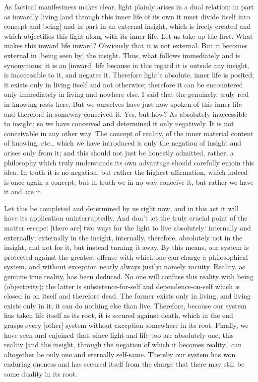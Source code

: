 As factical manifestness makes clear,
light plainly arises in a dual relation:
in part as inwardly living
[and through this inner life of its own it must
divide itself into concept and being]
and in part in an external insight,
which is freely created
and which objectifies this light
along with its inner life.
Let us take up the first.
What makes this inward life inward?
Obviously that it is not external.
But it becomes external in [being seen by] the insight.
Thus, what follows immediately and is synonymous:
it is an [inward] life because in this regard it is
outside any insight, is inaccessible to it, and negates it.
Therefore light's absolute, inner life is posited;
it exists only in living itself and not otherwise;
therefore it can be encountered only immediately
in living and nowhere else.
I said that the genuinely, truly real in knowing rests here.
But we ourselves have just now spoken of this inner life
and therefore in someway conceived it.
Yes, but how? As absolutely inaccessible to insight;
so we have conceived and determined it only negatively.
It is not conceivable in any other way.
The concept of reality, of the inner material content of knowing, etc.,
which we have introduced is only the negation of insight
and arises only from it;
and this should not just be honestly admitted,
rather, a philosophy which truly understands its own advantage
should carefully enjoin this idea.
In truth it is no negation,
but rather the highest affirmation,
which indeed is once again a concept;
but in truth we in no way conceive it,
but rather we have it and are it.

Let this be completed and determined by us right now,
and in this act it will have its application uninterruptedly.
And don't let the truly crucial
point of the matter escape:
[there are] two ways
for the light to live absolutely:
internally and externally;
externally in the insight,
internally, therefore, absolutely not in the insight,
and not for it, but instead turning it away.
By this means, our system is protected against
the greatest offense with which
one can charge a philosophical system,
and without exception nearly always justly:
namely vacuity.
Reality, as genuine true reality, has been deduced.
No one will confuse this reality with being (objectivity);
the latter is subsistence-for-self and dependence-on-self
which is closed in on itself and therefore dead.
The former exists only in living,
and living exists only in it;
it can do nothing else than live.
Therefore, because our system has taken life
itself as its root,
it is secured against death,
which in the end grasps every [other]
system without exception somewhere in its root.
Finally, we have seen and enjoined that,
since light and life too are absolutely one,
this reality
[and the insight,
through the negation of which
it becomes reality,]
can altogether be only one
and eternally self-same.
Thereby our system has won enduring oneness
and has secured itself from the charge that
there may still be some duality in its root.

